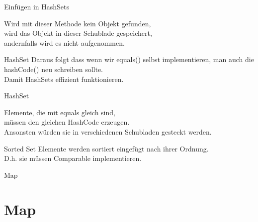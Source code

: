 \documentclass[10pt]{beamer}
\begin{document}
\begin{frame}[fragile]{Einfügen in HashSets}


 

Wird mit dieser Methode kein Objekt gefunden,\\ 
wird das Objekt in dieser Schublade gespeichert,\\ 
andernfalls wird es nicht aufgenommen. 
\end{frame}

\begin{frame}[fragile]{HashSet}
Daraus folgt dass wenn wir \textcolor{mygreen}{equals()} selbst implementieren, man auch die \textcolor{mygreen}{hashCode()} neu schreiben sollte.\\ 
Damit \textcolor{mygreen}{HashSets} effizient funktionieren.
\end{frame}

\begin{frame}[fragile]{HashSet}

Elemente, die mit \textcolor{mygreen}{equals} gleich sind, \\ 
müssen den gleichen \textcolor{mygreen}{HashCode} erzeugen. \\
Ansonsten würden sie in verschiedenen Schubladen gesteckt werden.
\end{frame}

\begin{frame}[fragile]{Sorted Set}
Elemente werden sortiert eingefügt nach ihrer Ordnung.\\
D.h. sie müssen Comparable implementieren.
\end{frame}

\begin{frame}[fragile]{Map}
    \section{Map}
\end{frame}
\end{document}
